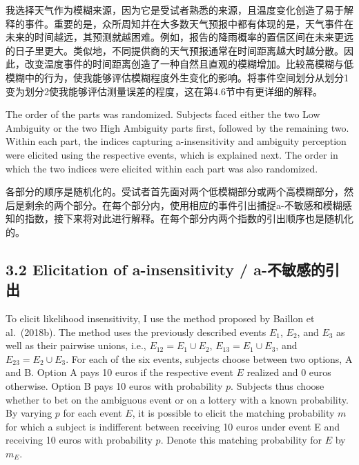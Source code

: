 \documentclass[12pt,a4paper]{article}
\newenvironment{original}
  {\par\medskip\noindent\color{black}\ignorespaces}
  {\par\medskip}
\newenvironment{translation}
  {\par\noindent\color{transblue}\ignorespaces}
  {\par\medskip\medskip}
\begin{document}
\begin{translation}
我选择天气作为模糊来源，因为它是受试者熟悉的来源，且温度变化创造了易于解释的事件。重要的是，众所周知并在大多数天气预报中都有体现的是，天气事件在未来的时间越远，其预测就越困难。例如，报告的降雨概率的置信区间在未来更远的日子里更大。类似地，不同提供商的天气预报通常在时间距离越大时越分散。因此，改变温度事件的时间距离创造了一种自然且直观的模糊增加。比较高模糊与低模糊中的行为，使我能够评估模糊程度外生变化的影响。将事件空间划分从划分1变为划分2使我能够评估测量误差的程度，这在第4.6节中有更详细的解释。
\end{translation}

\begin{original}
The order of the parts was randomized. Subjects faced either the two Low Ambiguity or the two High Ambiguity parts first, followed by the remaining two. Within each part, the indices capturing a-insensitivity and ambiguity perception were elicited using the respective events, which is explained next. The order in which the two indices were elicited within each part was also randomized.
\end{original}

\begin{translation}
各部分的顺序是随机化的。受试者首先面对两个低模糊部分或两个高模糊部分，然后是剩余的两个部分。在每个部分内，使用相应的事件引出捕捉a-不敏感和模糊感知的指数，接下来将对此进行解释。在每个部分内两个指数的引出顺序也是随机化的。
\end{translation}

\subsection{3.2 Elicitation of a-insensitivity / a-不敏感的引出}

\begin{original}
To elicit likelihood insensitivity, I use the method proposed by Baillon et al.\ (2018b). The method uses the previously described events $E_1$, $E_2$, and $E_3$ as well as their pairwise unions, i.e., $E_{12} = E_1 \cup E_2$, $E_{13} = E_1 \cup E_3$, and $E_{23} = E_2 \cup E_3$. For each of the six events, subjects choose between two options, A and B. Option A pays 10 euros if the respective event $E$ realized and 0 euros otherwise. Option B pays 10 euros with probability $p$. Subjects thus choose whether to bet on the ambiguous event or on a lottery with a known probability. By varying $p$ for each event $E$, it is possible to elicit the matching probability $m$ for which a subject is indifferent between receiving 10 euros under event E and receiving 10 euros with probability $p$. Denote this matching probability for $E$ by $m_E$.
\end{original}
\end{document}
